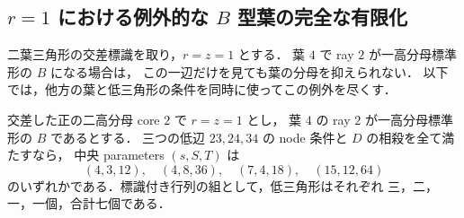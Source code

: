
\subsection{\texorpdfstring{$r=1$}{r=1} における例外的な \texorpdfstring{$B$}{B} 型葉の完全な有限化}
\label{rb16:section}

二葉三角形の交差標識を取り，$r=z=1$ とする．
葉 $4$ で ray $2$ が一高分母標準形の $B$ になる場合は，
この一辺だけを見ても葉の分母を抑えられない．
以下では，他方の葉と低三角形の条件を同時に使ってこの例外を尽くす．

\begin{proposition}[$B$ 型葉を持つ低三角形の完全表]
\label{rb16:complete-list}
交差した正の二高分母 core $2$ で $r=z=1$ とし，
葉 $4$ の ray $2$ が一高分母標準形の $B$ であるとする．
三つの低辺 $23,24,34$ の node 条件と $D$ の相殺を全て満たすなら，
中央 parameters $(s,S,T)$ は
\[
 (4,3,12),\quad(4,8,36),\quad(7,4,18),\quad(15,12,64)
\]
のいずれかである．標識付き行列の組として，低三角形はそれぞれ
三，二，一，一個，合計七個である．
\end{proposition}

